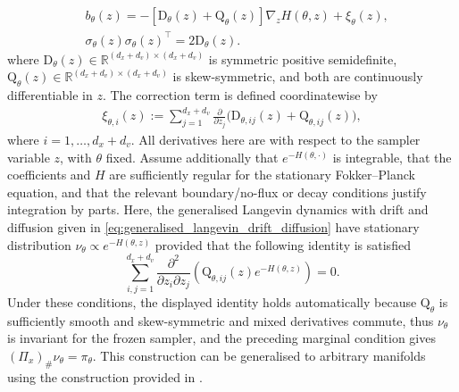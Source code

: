 \begin{align}\label{eq:generalised_langevin_drift_diffusion}
    &b_\theta(z)
    =
    -[\mathrm{D}_\theta(z)+\mathrm{Q}_\theta(z)]\nabla_z H(\theta,z)
    +\xi_\theta(z),\\
    &\sigma_\theta(z)\sigma_\theta(z)^\top
    =
    2\mathrm{D}_\theta(z).
\end{align}
where $\mathrm{D}_\theta(z)\in\mathbb{R}^{(d_x+d_v)\times(d_x+d_v)}$ is symmetric positive semidefinite, $\mathrm{Q}_\theta(z)\in\mathbb{R}^{(d_x+d_v)\times(d_x+d_v)}$ is skew-symmetric, and both are continuously differentiable in $z$. The correction term is defined coordinatewise by
\begin{align}
    \xi_{\theta,i}(z)
    :=
    \sum_{j=1}^{d_x+d_v}
    \frac{\partial}{\partial z_j}
    \bigl(\mathrm{D}_{\theta,ij}(z)+\mathrm{Q}_{\theta,ij}(z)\bigr),
\end{align}
where $i=1,\ldots,d_x+d_v$. All derivatives here are with respect to the sampler variable $z$, with $\theta$ fixed. Assume additionally that $e^{-H(\theta,\cdot)}$ is integrable, that the coefficients and $H$ are sufficiently regular for the stationary Fokker--Planck equation, and that the relevant boundary/no-flux or decay conditions justify integration by parts. Here, the generalised Langevin dynamics with drift and diffusion given in \eqref{eq:generalised_langevin_drift_diffusion} have stationary distribution $\nu_\theta \propto e^{-H(\theta,z)}$ provided that the following identity is satisfied \citep{Ma_SGMCMC,yao2025accelerating}
\begin{equation*}
    \sum_{i,j=1}^{d_x+d_v}\frac{\partial^2}{\partial z_i\partial z_j}\left(\mathrm{Q}_{\theta,ij}(z)e^{-H(\theta,z)}\right)= 0.
\end{equation*}
Under these conditions, the displayed identity holds automatically because \(\mathrm{Q}_\theta\) is sufficiently smooth and skew-symmetric and mixed derivatives commute, thus $\nu_\theta$ is invariant for the frozen sampler, and the preceding marginal condition gives $(\Pi_x)_\#\nu_\theta=\pi_\theta$. This construction can be generalised to arbitrary manifolds using the construction provided in \citet{barp2021unifying}.

